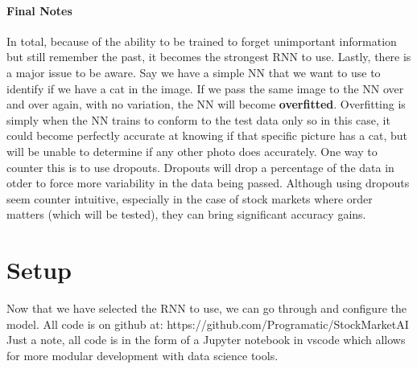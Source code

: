 \documentclass[12pt]{article}
\begin{document}
\paragraph{Final Notes}
In total, because of the ability to be trained to forget unimportant information but still remember the past, it becomes the strongest RNN to use. Lastly, there is a major issue to be aware. Say we have a simple NN that we want to use to identify if we have a cat in the image. If we pass the same image to the NN over and over again, with no variation, the NN will become \textbf{overfitted}. Overfitting is simply when the NN trains to conform to the test data only so in this case, it could become perfectly accurate at knowing if that specific picture has a cat, but will be unable to determine if any other photo does accurately. One way to counter this is to use dropouts. Dropouts will drop a percentage of the data in otder to force more variability in the data being passed. Although using dropouts seem counter intuitive, especially in the case of stock markets where order matters (which will be tested), they can bring significant accuracy gains. 

\section{Setup}
Now that we have selected the RNN to use, we can go through and configure the model. All code is on github at: https://github.com/Programatic/StockMarketAI
Just a note, all code is in the form of a Jupyter notebook in vscode which allows for more modular development with data science tools. \\
\end{document}
